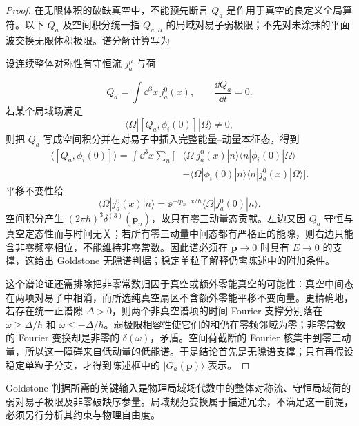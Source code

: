 \begin{proof}
在无限体积的破缺真空中，不能预先断言 $Q_a$ 是作用于真空的良定义全局算符。以下 $Q_a$ 及空间积分统一指 $Q_{a,R}$ 的局域对易子弱极限；不先对未涂抹的平面波交换无限体积极限。谱分解计算写为

设连续整体对称性有守恒流 \(j_a^\mu\) 与荷

\begin{equation*}
 Q_a=\int\dd^3 x\,j_a^0(x),
 \qquad
 \frac{\dd Q_a}{\dd t}=0.
\end{equation*}
若某个局域场满足
\begin{equation*}
 \langle\Omega|[Q_a,\phi_i(0)]|\Omega\rangle\neq0,
\end{equation*}
则把 \(Q_a\) 写成空间积分并在对易子中插入完整能量--动量本征态，得到
\begin{align*}
 \langle[Q_a,\phi_i(0)]\rangle
 =\int\dd^3 x\sum_n
 \bigl[&\langle\Omega|j_a^0(x)|n\rangle
 \langle n|\phi_i(0)|\Omega\rangle\\
 &-\langle\Omega|\phi_i(0)|n\rangle
 \langle n|j_a^0(x)|\Omega\rangle\bigr].
\end{align*}
平移不变性给
\begin{equation*}
 \langle\Omega|j_a^0(x)|n\rangle
 =\ee^{-\ii p_n\cdot x/\hbar}
 \langle\Omega|j_a^0(0)|n\rangle.
\end{equation*}
空间积分产生 \((2\pi\hbar)^3\delta^{(3)}(\mathbf p_n)\)，故只有零三动量态贡献。左边又因 \(Q_a\) 守恒与真空定态性而与时间无关；若所有零三动量中间态都有严格正的能隙，则右边只能含非零频率相位，不能维持非零常数。因此谱必须在 \(\mathbf p\to0\) 时具有 \(E\to0\) 的支撑，这给出 Goldstone 无隙谱判据；稳定单粒子解释仍需陈述中的附加条件。

这个谱论证还需排除把非零常数归因于真空或额外零能真空的可能性：真空中间态在两项对易子中相消，而所选纯真空扇区不含额外零能平移不变向量。更精确地，若存在统一正谱隙 $\Delta>0$，则两个非真空谱项的时间 Fourier 支撑分别落在 $\omega\ge\Delta/\hbar$ 和 $\omega\le-\Delta/\hbar$。弱极限相容性使它们的和仍在零频邻域为零；非零常数的 Fourier 变换却是非零的 $\delta(\omega)$，矛盾。空间荷截断的 Fourier 核集中到零三动量，所以这一障碍来自低动量的低能谱。于是结论首先是无隙谱支撑；只有再假设稳定单粒子分支，才得到陈述框中的 $|G_a(\mathbf p)\rangle$ 表示。

\end{proof}
Goldstone 判据所需的关键输入是物理局域场代数中的整体对称流、守恒局域荷的弱对易子极限及非零破缺序参量。局域规范变换属于描述冗余，不满足这一前提，必须另行分析其约束与物理自由度。

